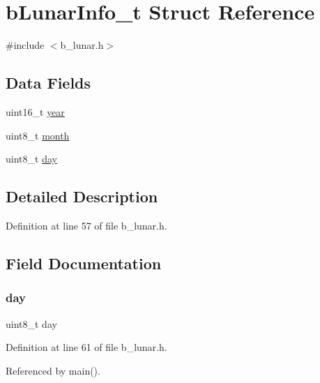 \hypertarget{structb_lunar_info__t}{}\section{b\+Lunar\+Info\+\_\+t Struct Reference}
\label{structb_lunar_info__t}


{\ttfamily \#include $<$b\+\_\+lunar.\+h$>$}

\subsection*{Data Fields}
\begin{DoxyCompactItemize}
\item 
uint16\+\_\+t \mbox{\hyperlink{structb_lunar_info__t_a57ca98d8f6d4baf0fe41c583c7dcb0d5}{year}}
\item 
uint8\+\_\+t \mbox{\hyperlink{structb_lunar_info__t_a3e00faf7fbf9805e9ec4d2edd6339050}{month}}
\item 
uint8\+\_\+t \mbox{\hyperlink{structb_lunar_info__t_a72369a1087b2aeffe374bb054cb97c12}{day}}
\end{DoxyCompactItemize}


\subsection{Detailed Description}


Definition at line 57 of file b\+\_\+lunar.\+h.



\subsection{Field Documentation}
\mbox{\label{structb_lunar_info__t_a72369a1087b2aeffe374bb054cb97c12}} 
\subsubsection{\texorpdfstring{day}{day}}
{\footnotesize\ttfamily uint8\+\_\+t day}



Definition at line 61 of file b\+\_\+lunar.\+h.



Referenced by main().

\mbox{\label{structb_lunar_info__t_a3e00faf7fbf9805e9ec4d2edd6339050}} 
